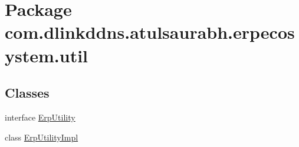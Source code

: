 \hypertarget{namespacecom_1_1dlinkddns_1_1atulsaurabh_1_1erpecosystem_1_1util}{}\section{Package com.\+dlinkddns.\+atulsaurabh.\+erpecosystem.\+util}
\label{namespacecom_1_1dlinkddns_1_1atulsaurabh_1_1erpecosystem_1_1util}
\subsection*{Classes}
\begin{DoxyCompactItemize}
\item 
interface \mbox{\hyperlink{interfacecom_1_1dlinkddns_1_1atulsaurabh_1_1erpecosystem_1_1util_1_1_erp_utility}{Erp\+Utility}}
\item 
class \mbox{\hyperlink{classcom_1_1dlinkddns_1_1atulsaurabh_1_1erpecosystem_1_1util_1_1_erp_utility_impl}{Erp\+Utility\+Impl}}
\end{DoxyCompactItemize}
